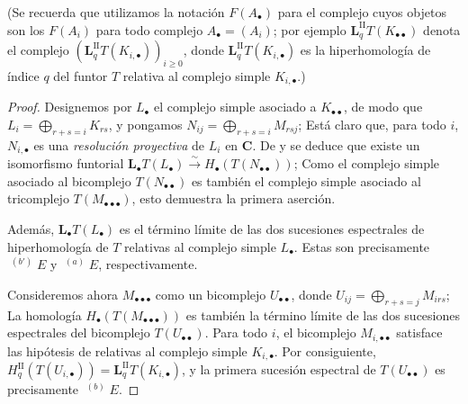 (Se recuerda que utilizamos la notación $F(A_\bullet)$ para el complejo cuyos objetos son los $F(A_i)$ para todo complejo $A_\bullet=(A_i)$; por ejemplo $\mathbf{L}_q^{\mathrm{II}}T(K_{\bullet\bullet})$ denota el complejo
$(\mathbf{L}_q^{\mathrm{II}}T(K_{i,\bullet}))_{i\geq0}$,
donde $\mathbf{L}_q^{\mathrm{II}}T(K_{i,\bullet})$ es la hiperhomología de índice
$q$ del funtor $T$ relativa al complejo simple $K_{i,\bullet}$.)

\begin{proof}
Designemos por $L_\bullet$ el complejo simple asociado a
$K_{\bullet\bullet}$, de modo que
$L_i=\bigoplus_{r+s=i}K_{rs}$,
y pongamos
$N_{ij}=\bigoplus_{r+s=i}M_{rsj}$;
Está claro que, para todo $i$, $N_{i,\bullet}$ es una \emph{resolución proyectiva}
de $L_i$ en $\boldsymbol{C}$.
De  y  se deduce que existe un
isomorfismo funtorial
$
\mathbf{L}_\bullet T(L_\bullet)\xrightarrow{\sim} H_\bullet(T(N_{\bullet\bullet}))$;
Como el complejo simple asociado al bicomplejo
$T(N_{\bullet\bullet})$ es también el complejo simple asociado al
tricomplejo $T(M_{\bullet\bullet\bullet})$, esto demuestra la primera aserción.

Además, $\mathbf{L}_\bullet T(L_\bullet)$ es el término límite de las dos
sucesiones espectrales de hiperhomología  de $T$ relativas al
complejo simple $L_\bullet$.
Estas son precisamente $\mathop{}^{(b')}E$ y $\mathop{}^{(a)}E$,
respectivamente.

Consideremos ahora $M_{\bullet\bullet\bullet}$ como un bicomplejo
$U_{\bullet\bullet}$, donde
$U_{ij}=\bigoplus_{r+s=j}M_{irs}$;
La homología $H_\bullet(T(M_{\bullet\bullet\bullet}))$ es también la
término límite de las dos sucesiones espectrales del bicomplejo
$T(U_{\bullet\bullet})$.
Para todo $i$, el bicomplejo $M_{i,\bullet\bullet}$ satisface las
hipótesis de  relativas al complejo simple
$K_{i,\bullet}$.
Por consiguiente,
$H_q^{\mathrm{II}}(T(U_{i,\bullet}))=
\mathbf{L}_q^{\mathrm{II}}T(K_{i,\bullet})$,
y la primera sucesión espectral de $T(U_{\bullet\bullet})$ es precisamente
$\mathop{}^{(b)}E$.


\end{proof}
